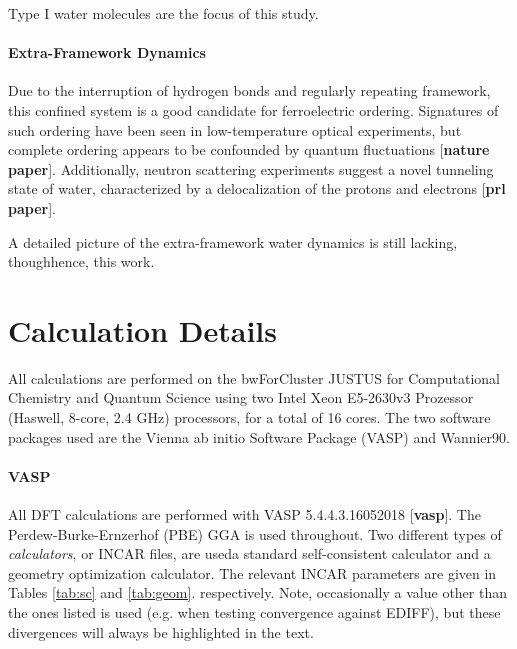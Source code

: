         Type I water molecules are the focus of this study.
        
        \paragraph{Extra-Framework Dynamics} Due to the interruption of hydrogen bonds and regularly repeating framework, this confined system is a good candidate for ferroelectric ordering. Signatures of such ordering have been seen in low-temperature optical experiments, but complete ordering appears to be confounded by quantum fluctuations [\textbf{nature paper}]. Additionally, neutron scattering experiments suggest a novel tunneling state of water, characterized by a delocalization of the protons and electrons [\textbf{prl paper}].
        
        A detailed picture of the extra-framework water dynamics is still lacking, though\textemdash hence, this work.
        
    \section{Calculation Details}
    
    All calculations are performed on the bwForCluster JUSTUS for Computational Chemistry and Quantum Science using two Intel Xeon E5-2630v3 Prozessor (Haswell, 8-core, 2.4 GHz) processors, for a total of 16 cores. The two software packages used are the Vienna ab initio Software Package (VASP) and Wannier90.
    
    \paragraph{VASP} All DFT calculations are performed with VASP 5.4.4.3.16052018 [\textbf{vasp}]. The Perdew-Burke-Ernzerhof (PBE) GGA is used throughout. Two different types of \textit{calculators}, or INCAR files, are used\textemdash a standard self-consistent calculator and a geometry optimization calculator. The relevant INCAR parameters are given in Tables \ref{tab:sc} and \ref{tab:geom}. respectively. Note, occasionally a value other than the ones listed is used (e.g. when testing convergence against EDIFF), but these divergences will always be highlighted in the text.
    
